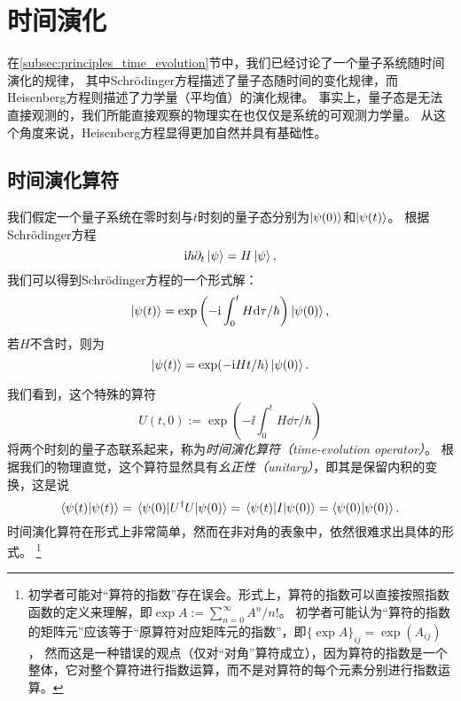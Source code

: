 \section{时间演化}
\label{sec:time_evol}

在\ref{subsec:principles_time_evolution}节中，我们已经讨论了一个量子系统随时间演化的规律，
其中Schrödinger方程描述了量子态随时间的变化规律，而Heisenberg方程则描述了力学量（平均值）的演化规律。
事实上，量子态是无法直接观测的，我们所能直接观察的物理实在也仅仅是系统的可观测力学量。
从这个角度来说，Heisenberg方程显得更加自然并具有基础性。

\subsection{时间演化算符}

我们假定一个量子系统在零时刻与$t$时刻的量子态分别为$\ket{\psi(0)}$和$\ket{\psi(t)}$。
根据Schrödinger方程
\begin{equation}
    \mathrm{i}\hbar\partial_t\ket{\psi} = H\ket{\psi},
\end{equation}
我们可以得到Schrödinger方程的一个形式解：
\begin{equation}
    \ket{\psi(t)} = \exp\left(-\mathrm{i} \int_0^t H \dd\tau /\hbar\right)\ket{\psi(0)},
\end{equation}
若$H$不含时，则为
\begin{equation}
    \ket{\psi(t)} = \exp(-\mathrm{i} H t/\hbar)\ket{\psi(0)}.
\end{equation}

我们看到，这个特殊的算符
\begin{equation}
    U(t,0) := \exp\left(-\ii \int_0^t H \dd\tau /\hbar\right)
\end{equation}
将两个时刻的量子态联系起来，称为\emph{时间演化算符（time-evolution operator）}。
根据我们的物理直觉，这个算符显然具有\emph{幺正性（unitary）}，即其是保留内积的变换，这是说
\begin{equation}
    \innerproduct{\psi(t)}{\psi(t)} = \mel{\psi(0)}{U^\dag U}{\psi(0)} = \mel{\psi(t)}{I}{\psi(0)} = \innerproduct{\psi(0)}{\psi(0)}.
\end{equation}
时间演化算符在形式上非常简单，然而在非对角的表象中，依然很难求出具体的形式。
\footnote{初学者可能对``算符的指数''存在误会。形式上，算符的指数可以直接按照指数函数的定义来理解，即$\exp A := \sum_{n=0}^\infty A^n/n!$。
    初学者可能认为``算符的指数的矩阵元''应该等于``原算符对应矩阵元的指数''，即$\{\exp A\}_{ij} = \exp(A_{ij})$，
    然而这是一种错误的观点（仅对``对角''算符成立），因为算符的指数是一个整体，它对整个算符进行指数运算，而不是对算符的每个元素分别进行指数运算。
}

